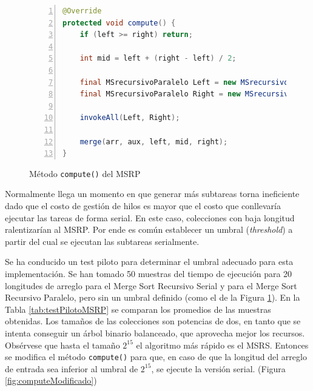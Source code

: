 \documentclass[titlepage]{article}
\begin{document}
\begin{figure}[h]
    \begin{lstlisting}[language=java, frame=single, numbers=left]
@Override
protected void compute() {
	if (left >= right) return;
	
	int mid = left + (right - left) / 2;
	
	final MSrecursivoParalelo Left = new MSrecursivoParalelo(arr, aux, left, mid);
	final MSrecursivoParalelo Right = new MSrecursivoParalelo(arr, aux, mid + 1, right);
	
	invokeAll(Left, Right);
	
	merge(arr, aux, left, mid, right);
}
    \end{lstlisting}
    \caption{Método \lstinline{compute()} del MSRP}
    \label{fig:MSRP_Compute}
\end{figure}

Normalmente llega un momento en que generar más subtareas torna ineficiente dado que el costo de gestión de hilos es mayor que el costo que conllevaría ejecutar las tareas de forma serial. En este caso, colecciones con baja longitud ralentizarían al MSRP. Por ende es común establecer un umbral (\textit{threshold}) a partir del cual se ejecutan las subtareas serialmente.

Se ha conducido un test piloto para determinar el umbral adecuado para esta implementación. Se han tomado 50 muestras del tiempo de ejecución para 20 longitudes de arreglo para el Merge Sort Recursivo Serial y para el Merge Sort Recursivo Paralelo, pero sin un umbral definido (como el de la Figura \ref{fig:MSRP_Compute}). En la Tabla \ref{tab:testPilotoMSRP} se comparan los promedios de las muestras obtenidas. Los tamaños de las colecciones son potencias de dos, en tanto que se intenta conseguir un árbol binario balanceado, que aprovecha mejor los recursos. Obsérvese que hasta el tamaño $2^{15}$ el algoritmo más rápido es el MSRS. Entonces se modifica el método \lstinline{compute()} para que, en caso de que la longitud del arreglo de entrada sea inferior al umbral de $2^{15}$, se ejecute la versión serial. (Figura \ref{fig:computeModificado})
\end{document}
